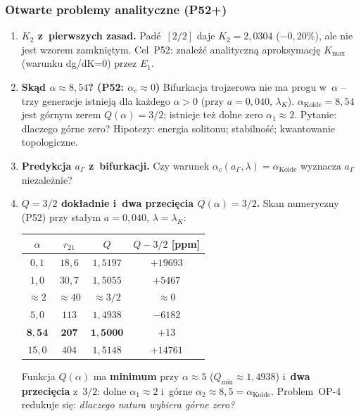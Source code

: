 \subsubsection{Otwarte problemy analityczne (P52+)}%
\label{app:F-open-P52}

\begin{enumerate}[label=\textbf{OP-\arabic*},leftmargin=3em]
  \item \textbf{$K_2$ z~pierwszych zasad.}
        Pad\'e~$[2/2]$ daje $K_2=2{,}0304$ ($-0{,}20\%$),
        ale nie jest wzorem zamkni\k{e}tym.
        Cel~P52: znale\'z\'c analityczn\k{a} aproksymacj\k{e}
        $K_\mathrm{max}$ (warunku dg/dK=0) przez $E_1$.

  \item \textbf{Sk\k{a}d $\alpha\approx8{,}54$? (P52: $\alpha_c\approx0$)}
        Bifurkacja trojzerowa nie ma progu w~$\alpha$ -- trzy generacje
        istniej\k{a} dla ka\.zdego $\alpha>0$ (przy $a=0{,}040$, $\lambda_K$).
        $\alpha_\mathrm{Koide}=8{,}54$ jest g\'ornym zerem $Q(\alpha)=3/2$;
        istnieje te\.z dolne zero $\alpha_1\approx2$.
        Pytanie: dlaczego g\'orne zero?
        Hipotezy: energia solitonu; stabilno\'s\'c; kwantowanie topologiczne.

  \item \textbf{Predykcja $a_\Gamma$ z~bifurkacji.}
        Czy warunek $\alpha_c(a_\Gamma,\lambda)=\alpha_\mathrm{Koide}$
        wyznacza $a_\Gamma$ niezale\.znie?

  \item \textbf{$Q=3/2$ dok\l{}adnie i~dwa przeci\k{e}cia $Q(\alpha)=3/2$.}
        Skan numeryczny (P52) przy sta\l{}ym $a=0{,}040$, $\lambda=\lambda_K$:
        \begin{center}
        \begin{tabular}{cccc}
        \toprule
        $\alpha$ & $r_{21}$ & $Q$ & $Q-3/2$ [ppm] \\\midrule
        $0{,}1$ & $18{,}6$ & $1{,}5197$ & $+19693$ \\
        $1{,}0$ & $30{,}7$ & $1{,}5055$ & $+5467$ \\
        $\approx\!2$ & $\approx\!40$ & $\approx\!3/2$ & $\approx0$ \\
        $5{,}0$ & $113$ & $1{,}4938$ & $-6182$ \\
        $\mathbf{8{,}54}$ & $\mathbf{207}$ & $\mathbf{1{,}5000}$ & $+13$ \\
        $15{,}0$ & $404$ & $1{,}5148$ & $+14761$ \\\bottomrule
        \end{tabular}
        \end{center}
        Funkcja $Q(\alpha)$ ma \textbf{minimum} przy $\alpha\approx5$
        ($Q_{\min}\approx1{,}4938$) i~\textbf{dwa przeci\k{e}cia} z~$3/2$:
        dolne $\alpha_1\approx2$ i~g\'orne $\alpha_2\approx8{,}5=\alpha_\mathrm{Koide}$.
        Problem~OP-4 redukuje si\k{e}: \emph{dlaczego natura wybiera g\'orne zero?}


\end{enumerate}
